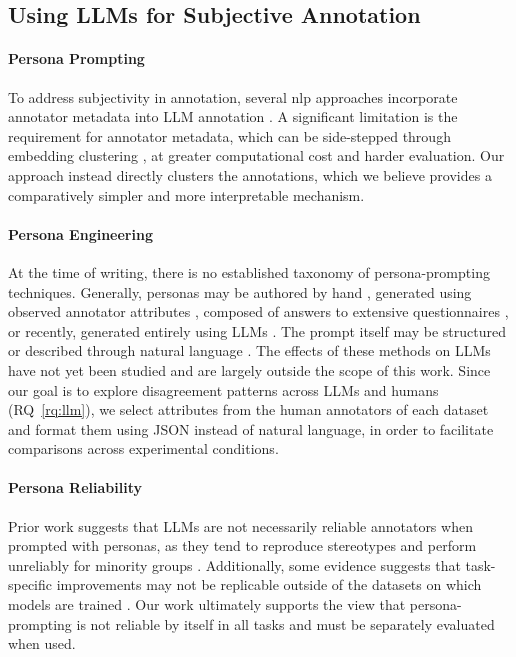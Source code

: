 \documentclass[manuscript,screen,review,anonymous]{acmart}
\theoremstyle{acmplain}
\theoremstyle{researchquestionstyle}
\begin{document}
\subsection{Using LLMs for Subjective Annotation}

\paragraph{Persona Prompting} To address subjectivity in annotation, several \ac{nlp} approaches incorporate annotator metadata into LLM annotation \citep{davani-etal-2023-hate, rottger-etal-2022-two, fleisig-etal-2023-majority, gupta_2023_same}. A significant limitation is the requirement for annotator metadata, which can be side-stepped through embedding clustering \citep{vitsakis-etal-2024-voices}, at greater computational cost and harder evaluation. Our approach instead directly clusters the annotations, which we believe provides a comparatively simpler and more interpretable mechanism.

\paragraph{Persona Engineering} At the time of writing, there is no established taxonomy of persona-prompting techniques. Generally, personas may be authored by hand \citep{zhang-etal-2018-personalizing, mazare-etal-2018-training}, generated using observed annotator attributes \citep{argyle2023_out}, composed of answers to extensive questionnaires \citep{park2026llmagentsgroundedselfreports},  or recently, generated entirely using LLMs \citep{taubenfeld-etal-2024-systematic}.
The prompt itself may be structured \citep{yang-etal-2025-crafting, wang-etal-2025-know, Park2024CharacterGPTAP} or described through natural language \citep{zhang-etal-2018-personalizing, li-etal-2025-far, taubenfeld-etal-2024-systematic}. The effects of these methods on LLMs have not yet been studied and are largely outside the scope of this work. Since our goal is to explore disagreement patterns across LLMs and humans (RQ~\ref{rq:llm}), we select attributes from the human annotators of each dataset and format them using JSON instead of natural language, in order to facilitate comparisons across experimental conditions.

\paragraph{Persona Reliability} Prior work suggests that LLMs are not necessarily reliable annotators when prompted with personas, as they tend to reproduce stereotypes \citep{lutz-etal-2025-prompt, liu-etal-2024-evaluating-large} and perform unreliably for minority groups \citep{lutz-etal-2025-prompt, kapania-etal-2025-examining}. Additionally, some evidence suggests that task-specific improvements may not be replicable outside of the datasets on which models are trained \citep{lee-etal-2023-large}. Our work ultimately supports the view that persona-prompting is not reliable by itself in all tasks and must be separately evaluated when used.
\end{document}
